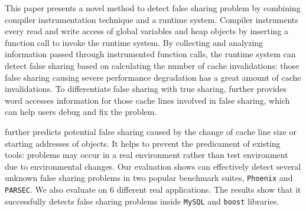 \label{sec:conclusion}
This paper presents a novel method to detect false sharing problem by combining
compiler instrumentation technique and a runtime system. 
Compiler instruments every read and write access of global variables
and heap objects by inserting a function call to invoke the runtime
system. 
By collecting and analyzing information passed through instrumented function calls, the runtime system 
can detect false sharing based on calculating the number of cache invalidations: those 
false sharing causing severe performance degradation has a great amount of 
cache invalidations. To differentiate false sharing with true sharing, 
\Predator{} further provides word accesses information for those cache lines involved in false sharing, 
which can help users debug and fix the problem.

\Predator{} further predicts potential false sharing caused by the change of cache line size 
or starting addresses of objects. It helps to prevent the predicament of existing tools:
problems may occur in a real environment rather than test environment due to environmental changes.
Our evaluation shows \Predator{} can effectively detect several unknown false sharing problems in two popular benchmark
suites, \texttt{Phoenix} and \texttt{PARSEC}. 
We also evaluate \Predator{} on $6$ different real applications. The results
show that it successfully detects false sharing problems inside \texttt{MySQL} and \texttt{boost} libraries. 
